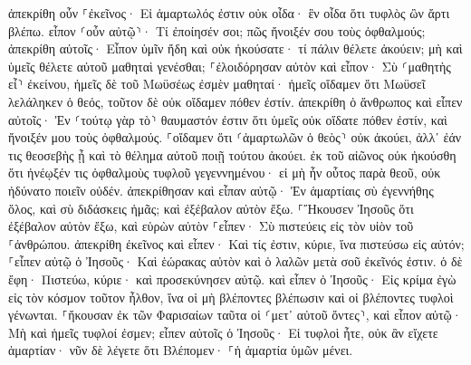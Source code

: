 \documentclass[twoside, 9pt]{extreport}
\begin{document}
ἀπεκρίθη οὖν ⸀ἐκεῖνος· Εἰ ἁμαρτωλός ἐστιν οὐκ οἶδα· ἓν οἶδα ὅτι τυφλὸς ὢν ἄρτι βλέπω. 
εἶπον ⸂οὖν αὐτῷ⸃· Τί ἐποίησέν σοι; πῶς ἤνοιξέν σου τοὺς ὀφθαλμούς; 
ἀπεκρίθη αὐτοῖς· Εἶπον ὑμῖν ἤδη καὶ οὐκ ἠκούσατε· τί πάλιν θέλετε ἀκούειν; μὴ καὶ ὑμεῖς θέλετε αὐτοῦ μαθηταὶ γενέσθαι; 
⸀ἐλοιδόρησαν αὐτὸν καὶ εἶπον· Σὺ ⸂μαθητὴς εἶ⸃ ἐκείνου, ἡμεῖς δὲ τοῦ Μωϋσέως ἐσμὲν μαθηταί· 
ἡμεῖς οἴδαμεν ὅτι Μωϋσεῖ λελάληκεν ὁ θεός, τοῦτον δὲ οὐκ οἴδαμεν πόθεν ἐστίν. 
ἀπεκρίθη ὁ ἄνθρωπος καὶ εἶπεν αὐτοῖς· Ἐν ⸂τούτῳ γὰρ τὸ⸃ θαυμαστόν ἐστιν ὅτι ὑμεῖς οὐκ οἴδατε πόθεν ἐστίν, καὶ ἤνοιξέν μου τοὺς ὀφθαλμούς. 
⸀οἴδαμεν ὅτι ⸂ἁμαρτωλῶν ὁ θεὸς⸃ οὐκ ἀκούει, ἀλλ᾽ ἐάν τις θεοσεβὴς ᾖ καὶ τὸ θέλημα αὐτοῦ ποιῇ τούτου ἀκούει. 
ἐκ τοῦ αἰῶνος οὐκ ἠκούσθη ὅτι ἠνέῳξέν τις ὀφθαλμοὺς τυφλοῦ γεγεννημένου· 
εἰ μὴ ἦν οὗτος παρὰ θεοῦ, οὐκ ἠδύνατο ποιεῖν οὐδέν. 
ἀπεκρίθησαν καὶ εἶπαν αὐτῷ· Ἐν ἁμαρτίαις σὺ ἐγεννήθης ὅλος, καὶ σὺ διδάσκεις ἡμᾶς; καὶ ἐξέβαλον αὐτὸν ἔξω. 
⸀Ἤκουσεν Ἰησοῦς ὅτι ἐξέβαλον αὐτὸν ἔξω, καὶ εὑρὼν αὐτὸν ⸀εἶπεν· Σὺ πιστεύεις εἰς τὸν υἱὸν τοῦ ⸀ἀνθρώπου. 
ἀπεκρίθη ἐκεῖνος καὶ εἶπεν· Καὶ τίς ἐστιν, κύριε, ἵνα πιστεύσω εἰς αὐτόν; 
⸀εἶπεν αὐτῷ ὁ Ἰησοῦς· Καὶ ἑώρακας αὐτὸν καὶ ὁ λαλῶν μετὰ σοῦ ἐκεῖνός ἐστιν. 
ὁ δὲ ἔφη· Πιστεύω, κύριε· καὶ προσεκύνησεν αὐτῷ. 
καὶ εἶπεν ὁ Ἰησοῦς· Εἰς κρίμα ἐγὼ εἰς τὸν κόσμον τοῦτον ἦλθον, ἵνα οἱ μὴ βλέποντες βλέπωσιν καὶ οἱ βλέποντες τυφλοὶ γένωνται. 
⸀ἤκουσαν ἐκ τῶν Φαρισαίων ταῦτα οἱ ⸂μετ᾽ αὐτοῦ ὄντες⸃, καὶ εἶπον αὐτῷ· Μὴ καὶ ἡμεῖς τυφλοί ἐσμεν; 
εἶπεν αὐτοῖς ὁ Ἰησοῦς· Εἰ τυφλοὶ ἦτε, οὐκ ἂν εἴχετε ἁμαρτίαν· νῦν δὲ λέγετε ὅτι Βλέπομεν· ⸀ἡ ἁμαρτία ὑμῶν μένει. 
\end{document}
